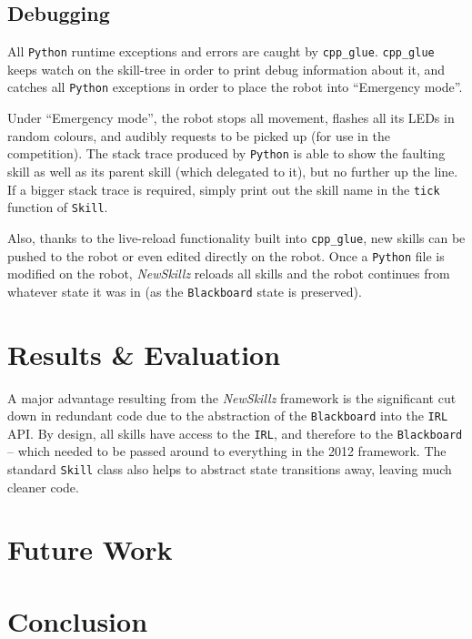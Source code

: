 \subsection{Debugging} 

All \verb!Python! runtime exceptions and errors are caught by \texttt{cpp\_glue}. \texttt{cpp\_glue} keeps watch on the skill-tree in order to print debug information about it, and catches all \verb!Python! exceptions in order to place the robot into ``Emergency mode''.

Under ``Emergency mode'', the robot stops all movement, flashes all its LEDs in random colours, and audibly requests to be picked up (for use in the competition). The stack trace produced by \verb!Python! is able to show the faulting skill as well as its parent skill (which delegated to it), but no further up the line. If a bigger stack trace is required, simply print out the skill name in the \texttt{tick} function of \texttt{Skill}.

Also, thanks to the live-reload functionality built into \texttt{cpp\_glue}, new skills can be pushed to the robot or even edited directly on the robot. Once a \verb!Python! file is modified on the robot, \textit{NewSkillz} reloads all skills and the robot continues from whatever state it was in (as the \texttt{Blackboard} state is preserved).

\section{Results \& Evaluation}

A major advantage resulting from the \textit{NewSkillz} framework is the significant cut down in redundant code due to the abstraction of the \texttt{Blackboard} into the \texttt{IRL} API. By design, all skills have access to the \texttt{IRL}, and therefore to the \texttt{Blackboard} -- which needed to be passed around to everything in the 2012 framework. The standard \texttt{Skill} class also helps to abstract state transitions away, leaving much cleaner code.

\section{Future Work}


\section{Conclusion}

